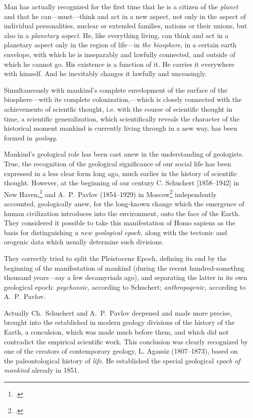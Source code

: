 Man has actually recognized for the first time that he is a citizen of the
\emph{planet} and that he can---must---think and act in a new aspect, not only
in the aspect of individual personalities, nuclear or extended families,
nations or their unions, but also in a \emph{planetary aspect}.  He, like
everything living, can think and act in a planetary aspect only in the region
of life---in \emph{the biosphere}, in a certain earth envelope, with which he
is inseparably and lawfully connected, and outside of which he cannot go.  His
existence is a function of it.  He carries it everywhere with himself.  And he
inevitably changes it lawfully and unceasingly.


\Section %
Simultaneously with mankind's complete envelopment of the surface of the
biosphere---with its complete colonization,---which is closely connected
with the achievements of scientfic thought, i.e. with the course of scientific
thought in time, a scientific generalization, which scientifically reveals the
character of the historical moment mankind is currently living through in a new
way, has been formed in \emph{geology}.

Mankind's geological role has been cast anew in the understanding of
geologists.  True, the recognition of the geological significance of our social
life has been expressed in a less clear form long ago, much earlier in the
history of scientific thought.  However, at the beginning of our century C.
Schuchert [1858--1942] in New
Haven,\footcite[80]{schuchert1933geology} and A.~P.\ Pavlov (1854--1929) in
Moscow\foreignlanguage{russian}{\footcite[с.~105 и
сл.]{pavlov1936geologicheskaya}} independently accounted, geologically anew,
for the long-known change which the emergence of human civilization introduces
into the environment, onto the face of the Earth.  They considered it possible
to take this manifestation of Homo sapiens as the basis for distinguishing
\emph{a new geological epoch,} along with the tectonic and orogenic data which
usually determine such divisions.

They correctly tried to split the Pleistocene Epoch, defining its end by the
beginning of the manifestation of mankind (during the recent hundred-somethng
thousand years---say a few decamyriads ago), and separating the latter in its
own geological epoch: \emph{psychozoic,} according to Schuchert;
\emph{anthropogenic,} according to A.~P.\ Pavlov.

Actually Ch.\ Schuchert and A.~P.\ Pavlov deepened and made more precise,
brought into the established in modern geology divisions of the history of the
Earth, a conculsion, which was made much before them, and which did not
contradict the empirical scientific work.  This conclusion was clearly
recognized by one of the creators of contemporary geology, L. Agassiz
(1807--1873), based on the paleontological history of \emph{life}.  He
established the special geological \emph{epoch of mankind} already in 1851.

